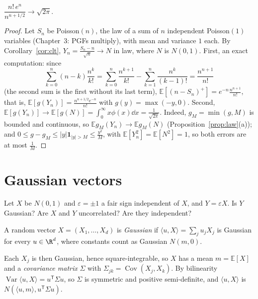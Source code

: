 \begin{theorem}\label{thm:stirlingclt}
$\dfrac{n!\,e^n}{n^{n+1/2}}\to\sqrt{2\pi}$.
\end{theorem}
\begin{proof}
Let $S_n$ be Poisson$(n)$, the law of a sum of $n$ independent Poisson$(1)$ variables (Chapter~3: PGFs multiply), with mean and
variance $1$ each. By Corollary~\ref{cor:clt}, $Y_n=\frac{S_n-n}{\sqrt n}\to N$ in law, where $N$ is $N(0,1)$. First, an exact computation: since
\[
\sum_{k=0}^n(n-k)\frac{n^k}{k!}=\sum_{k=0}^n\frac{n^{k+1}}{k!}-\sum_{k=1}^n\frac{n^k}{(k-1)!}=\frac{n^{n+1}}{n!}
\]
(the second sum is the first without its last term), $\mathbb E[(n-S_n)^+]=e^{-n}\frac{n^{n+1}}{n!}$, that is, $\mathbb E[g(Y_n)]=\frac{n^{n+1/2}e^{-n}}{n!}$ with $g(y)=\max(-y,0)$.
Second, $\mathbb E[g(Y_n)]\to\mathbb E[g(N)]=\int_0^\infty x\phi(x)\dd x=\frac1{\sqrt{2\pi}}$. Indeed, $g_M=\min(g,M)$ is bounded and continuous, so $\mathbb E g_M(Y_n)\to\mathbb E g_M(N)$
(Proposition~\ref{prop:law}(a)); and $0\le g-g_M\le|y|\mathbf 1_{|y|>M}\le\frac{y^2}M$, with $\mathbb E[Y_n^2]=\mathbb E[N^2]=1$, so both errors are at most $\frac1M$.
\end{proof}

\section{Gaussian vectors}

\begin{think}
Let $X$ be $N(0,1)$ and $\varepsilon=\pm1$ a fair sign independent of $X$, and $Y=\varepsilon X$. Is $Y$ Gaussian? Are $X$ and $Y$ uncorrelated? Are they
independent?
\end{think}

\begin{definition}
A random vector $X=(X_1,\dots,X_d)$ is \emph{Gaussian} if $\langle u,X\rangle=\sum_ju_jX_j$ is Gaussian for every $u\in\R^d$, where constants count as
Gaussian $N(m,0)$.
\end{definition}

Each $X_j$ is then Gaussian, hence square-integrable, so $X$ has a mean $m=\mathbb E[X]$ and a \emph{covariance matrix} $\Sigma$ with
$\Sigma_{jk}=\operatorname{Cov}(X_j,X_k)$. By bilinearity $\operatorname{Var}\langle u,X\rangle=u^{\mathsf T}\Sigma u$, so $\Sigma$ is symmetric and positive semi-definite, and $\langle u,X\rangle$ is $N(\langle u,m\rangle,u^{\mathsf T}\Sigma u)$.

